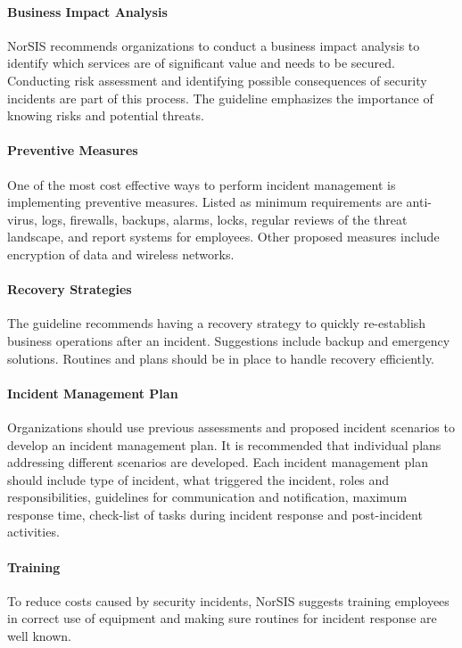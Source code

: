 \paragraph{Business Impact Analysis}
NorSIS recommends organizations to conduct a business impact analysis to identify which services are of significant value and needs to be secured. Conducting risk assessment and identifying possible consequences of security incidents are part of this process. The guideline emphasizes the importance of knowing risks and potential threats.  

\paragraph{Preventive Measures}
One of the most cost effective ways to perform incident management is implementing preventive measures. Listed as minimum requirements are anti-virus, logs, firewalls, backups, alarms, locks, regular reviews of the threat landscape, and report systems for employees. Other proposed measures include encryption of data and wireless networks.   

\paragraph{Recovery Strategies}
The guideline recommends having a recovery strategy to quickly re-establish business operations after an incident. Suggestions include backup and emergency solutions. Routines and plans should be in place to handle recovery efficiently.

\paragraph{Incident Management Plan}
Organizations should use previous assessments and proposed incident scenarios to develop an incident management plan. It is recommended that individual plans addressing different scenarios are developed. Each incident management plan should include type of incident, what triggered the incident, roles and responsibilities, guidelines for communication and notification, maximum response time, check-list of tasks during incident response and post-incident activities.

\paragraph{Training}
To reduce costs caused by security incidents, NorSIS suggests training employees in correct use of equipment and making sure routines for incident response are well known.

